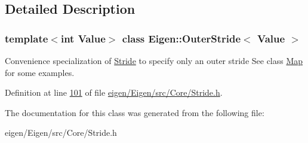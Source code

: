 \subsection{Detailed Description}
\subsubsection*{template$<$int Value$>$\newline
class Eigen\+::\+Outer\+Stride$<$ Value $>$}

Convenience specialization of \hyperlink{group___core___module_class_eigen_1_1_stride}{Stride} to specify only an outer stride See class \hyperlink{group___core___module_class_eigen_1_1_map}{Map} for some examples. 

Definition at line \hyperlink{eigen_2_eigen_2src_2_core_2_stride_8h_source_l00101}{101} of file \hyperlink{eigen_2_eigen_2src_2_core_2_stride_8h_source}{eigen/\+Eigen/src/\+Core/\+Stride.\+h}.



The documentation for this class was generated from the following file\+:\begin{DoxyCompactItemize}
\item 
eigen/\+Eigen/src/\+Core/\+Stride.\+h\end{DoxyCompactItemize}
